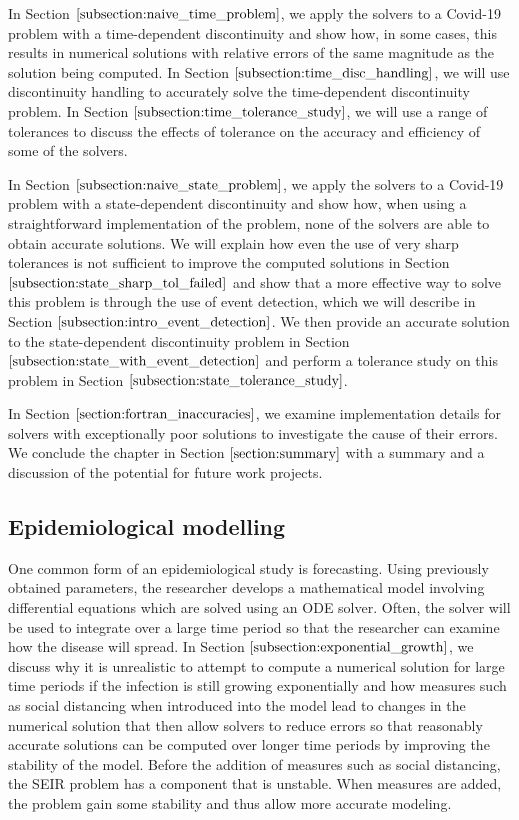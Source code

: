 In Section $\ref{subsection:naive_time_problem}$, we apply the solvers to a Covid-19 problem with a time-dependent discontinuity and show how, in some cases, this results in numerical solutions with relative errors of the same magnitude as the solution being computed. In Section $\ref{subsection:time_disc_handling}$, we will use discontinuity handling to accurately solve the time-dependent discontinuity problem. In Section $\ref{subsection:time_tolerance_study}$, we will use a range of tolerances to discuss the effects of tolerance on the accuracy and efficiency of some of the solvers.

In Section $\ref{subsection:naive_state_problem}$, we apply the solvers to a Covid-19 problem with a state-dependent discontinuity and show how, when using a straightforward implementation of the problem, none of the solvers are able to obtain accurate solutions. We will explain how even the use of very sharp tolerances is not sufficient to improve the computed solutions in Section $\ref{subsection:state_sharp_tol_failed}$ and show that a more effective way to solve this problem is through the use of event detection, which we will describe in Section $\ref{subsection:intro_event_detection}$. We then provide an accurate solution to the state-dependent discontinuity problem in Section $\ref{subsection:state_with_event_detection}$ and perform a tolerance study on this problem in Section $\ref{subsection:state_tolerance_study}$.

In Section $\ref{section:fortran_inaccuracies}$, we examine implementation details for solvers with exceptionally poor solutions to investigate the cause of their errors. We conclude the chapter in Section $\ref{section:summary}$ with a summary and a discussion of the potential for future work projects.

\subsection{Epidemiological modelling}
\label{subsection:research_papers}
One common form of an epidemiological study is forecasting. Using previously obtained parameters, the researcher develops a mathematical model involving differential equations which are solved using an ODE solver. Often, the solver will be used to integrate over a large time period so that the researcher can examine how the disease will spread. In Section $\ref{subsection:exponential_growth}$, we discuss why it is unrealistic to attempt to compute a numerical solution for large time periods if the infection is still growing exponentially and how measures such as social distancing when introduced into the model lead to changes in the numerical solution that then allow solvers to reduce errors so that reasonably accurate solutions can be computed over longer time periods by improving the stability of the model. Before the addition of measures such as social distancing, the SEIR problem has a component that is unstable. When measures are added, the problem gain some stability and thus allow more accurate modeling.

